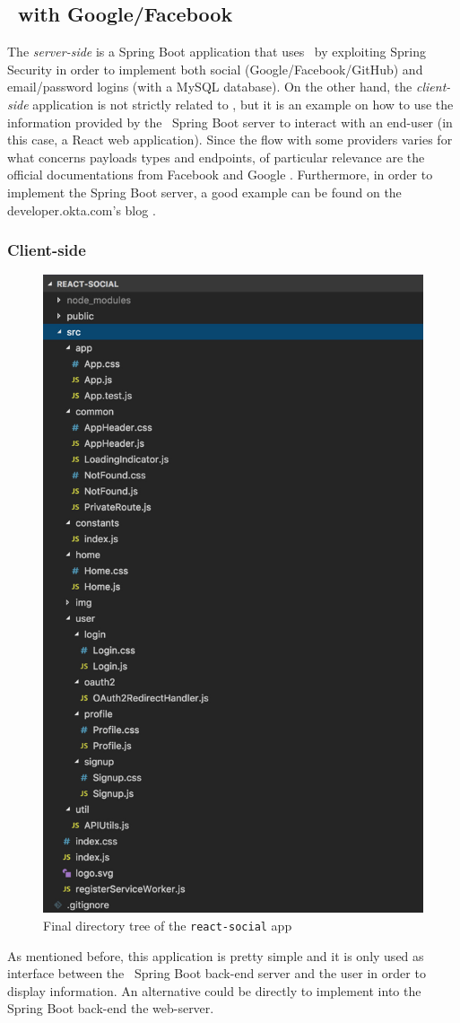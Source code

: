 \subsection{\oauth\ with Google/Facebook}
The \textit{server-side} is a Spring Boot application that uses \oauth\ by exploiting Spring Security in order to implement both social (Google/Facebook/GitHub) and email/password logins (with a MySQL database). On the other hand, the \textit{client-side} application is not strictly related to \oauth, but it is an example on how to use the information provided by the \oauth\ Spring Boot server to interact with an end-user (in this case, a React web application). Since the flow with some providers varies for what concerns payloads types and endpoints, of particular relevance are the official documentations from Facebook \cite{facebook} and Google \cite{google1, google2}. Furthermore, in order to implement the Spring Boot server, a good example can be found on the developer.okta.com's blog \cite{sprboot}. 

\subsubsection{Client-side}

\begin{figure}
  \begin{center}
    \includegraphics[width=0.31 \textwidth]{chapters/images/chp6/dirreact.jpg}
  \end{center}
  \caption{Final directory tree of the \texttt{react-social} app}
  \label{fig:dirtree}
\end{figure}

As mentioned before, this application is pretty simple and it is only used as interface between the \oauth\ Spring Boot back-end server and the user in order to display information. An alternative could be directly to implement into the Spring Boot back-end the web-server.

